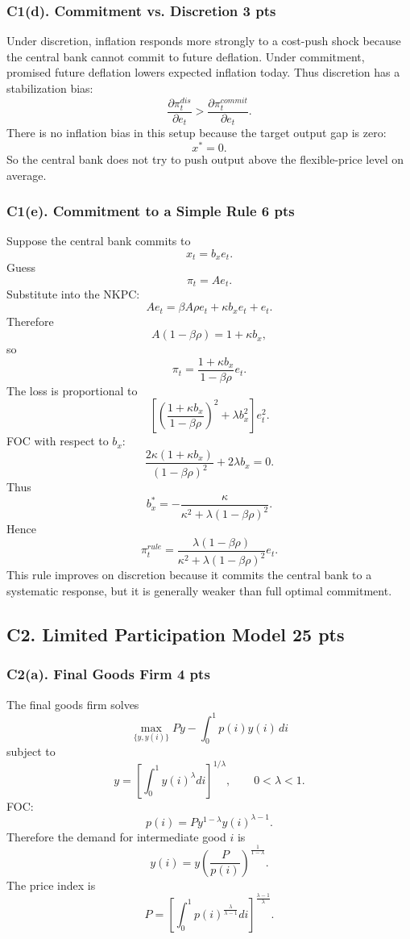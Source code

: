 \documentclass[11pt]{article}
\begin{document}
\clearpage
\subsubsection*{C1(d). Commitment vs. Discretion \hfill 3 pts}

Under discretion, inflation responds more strongly to a cost-push shock because the central bank cannot commit to future deflation. Under commitment, promised future deflation lowers expected inflation today. Thus discretion has a stabilization bias:
\[
\frac{\partial \pi_t^{dis}}{\partial e_t}
>
\frac{\partial \pi_t^{commit}}{\partial e_t}.
\]
There is no inflation bias in this setup because the target output gap is zero:
\[
x^*=0.
\]
So the central bank does not try to push output above the flexible-price level on average.

\clearpage

\subsubsection*{C1(e). Commitment to a Simple Rule \hfill 6 pts}

Suppose the central bank commits to
\[
x_t=b_xe_t.
\]
Guess
\[
\pi_t=Ae_t.
\]
Substitute into the NKPC:
\[
Ae_t=\beta A\rho e_t+\kappa b_xe_t+e_t.
\]
Therefore
\[
A(1-\beta\rho)=1+\kappa b_x,
\]
so
\[
\pi_t
=
\frac{1+\kappa b_x}{1-\beta\rho}e_t.
\]
The loss is proportional to
\[
\left[
\left(\frac{1+\kappa b_x}{1-\beta\rho}\right)^2
+\lambda b_x^2
\right]e_t^2.
\]
FOC with respect to \(b_x\):
\[
\frac{2\kappa(1+\kappa b_x)}{(1-\beta\rho)^2}
+2\lambda b_x=0.
\]
Thus
\[
b_x^*
=
-\frac{\kappa}{
\kappa^2+\lambda(1-\beta\rho)^2
}.
\]
Hence
\[
\pi_t^{rule}
=
\frac{\lambda(1-\beta\rho)}
{\kappa^2+\lambda(1-\beta\rho)^2}e_t.
\]
This rule improves on discretion because it commits the central bank to a systematic response, but it is generally weaker than full optimal commitment.

\clearpage
\subsection*{C2. Limited Participation Model \hfill 25 pts}

\subsubsection*{C2(a). Final Goods Firm \hfill 4 pts}

The final goods firm solves
\[
\max_{\{y,y(i)\}}
Py-\int_0^1p(i)y(i)\,di
\]
subject to
\[
y=
\left[
\int_0^1y(i)^\lambda di
\right]^{1/\lambda},
\qquad 0<\lambda<1.
\]
FOC:
\[
p(i)=P y^{1-\lambda}y(i)^{\lambda-1}.
\]
Therefore the demand for intermediate good \(i\) is
\[
y(i)
=
y\left(\frac{P}{p(i)}\right)^{\frac{1}{1-\lambda}}.
\]
The price index is
\[
P
=
\left[
\int_0^1p(i)^{\frac{\lambda}{\lambda-1}}di
\right]^{\frac{\lambda-1}{\lambda}}.
\]
\end{document}

